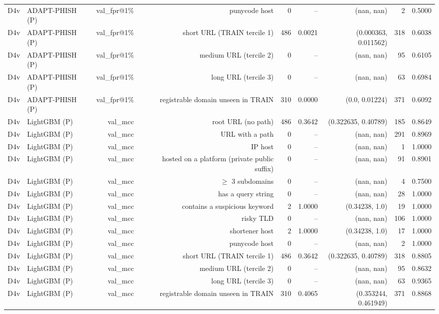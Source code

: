 \begin{table}[t]
\begin{tabular}{llrrrrrrr}
D4v & ADAPT-PHISH (P) & val\_fpr@1\% & punycode host & 0 & -- & (nan, nan) & 2 & 0.5000 \\
D4v & ADAPT-PHISH (P) & val\_fpr@1\% & short URL (TRAIN tercile 1) & 486 & 0.0021 & (0.000363, 0.011562) & 318 & 0.6038 \\
D4v & ADAPT-PHISH (P) & val\_fpr@1\% & medium URL (tercile 2) & 0 & -- & (nan, nan) & 95 & 0.6105 \\
D4v & ADAPT-PHISH (P) & val\_fpr@1\% & long URL (tercile 3) & 0 & -- & (nan, nan) & 63 & 0.6984 \\
D4v & ADAPT-PHISH (P) & val\_fpr@1\% & registrable domain unseen in TRAIN & 310 & 0.0000 & (0.0, 0.01224) & 371 & 0.6092 \\
D4v & LightGBM (P) & val\_mcc & root URL (no path) & 486 & 0.3642 & (0.322635, 0.40789) & 185 & 0.8649 \\
D4v & LightGBM (P) & val\_mcc & URL with a path & 0 & -- & (nan, nan) & 291 & 0.8969 \\
D4v & LightGBM (P) & val\_mcc & IP host & 0 & -- & (nan, nan) & 1 & 1.0000 \\
D4v & LightGBM (P) & val\_mcc & hosted on a platform (private public suffix) & 0 & -- & (nan, nan) & 91 & 0.8901 \\
D4v & LightGBM (P) & val\_mcc & $\geq$ 3 subdomains & 0 & -- & (nan, nan) & 4 & 0.7500 \\
D4v & LightGBM (P) & val\_mcc & has a query string & 0 & -- & (nan, nan) & 28 & 1.0000 \\
D4v & LightGBM (P) & val\_mcc & contains a suspicious keyword & 2 & 1.0000 & (0.34238, 1.0) & 19 & 1.0000 \\
D4v & LightGBM (P) & val\_mcc & risky TLD & 0 & -- & (nan, nan) & 106 & 1.0000 \\
D4v & LightGBM (P) & val\_mcc & shortener host & 2 & 1.0000 & (0.34238, 1.0) & 17 & 1.0000 \\
D4v & LightGBM (P) & val\_mcc & punycode host & 0 & -- & (nan, nan) & 2 & 1.0000 \\
D4v & LightGBM (P) & val\_mcc & short URL (TRAIN tercile 1) & 486 & 0.3642 & (0.322635, 0.40789) & 318 & 0.8805 \\
D4v & LightGBM (P) & val\_mcc & medium URL (tercile 2) & 0 & -- & (nan, nan) & 95 & 0.8632 \\
D4v & LightGBM (P) & val\_mcc & long URL (tercile 3) & 0 & -- & (nan, nan) & 63 & 0.9365 \\
D4v & LightGBM (P) & val\_mcc & registrable domain unseen in TRAIN & 310 & 0.4065 & (0.353244, 0.461949) & 371 & 0.8868 \\

\end{tabular}
\end{table}
